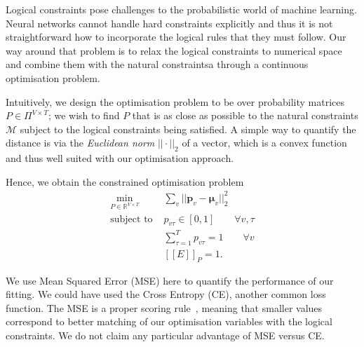 \documentclass[acmsmall, review, anonymous]{acmart}\settopmatter{printfolios=true,printccs=false,printacmref=false}
\newcommand{\qqpi}[2]{[\![#2]\!]_{#1}}
\newcommand{\margincomment}[2]{\marginpar{\scriptsize\color{Maroon}#1 says: #2}}
\newcommand{\cas}[1]{\margincomment{Charles}{#1}}
\begin{document}
Logical constraints pose challenges to the probabilistic world of
machine learning.  Neural networks cannot handle hard constraints explicitly and 
thus it is not straightforward how to incorporate the logical rules that they must follow.
Our way around that problem is to relax the logical constraints to numerical
space and combine them with the natural constraintsa through a continuous
optimisation problem.

Intuitively, we design the optimisation problem to be over
probability matrices $P \in \Pi^{V \times T}$; we wish to find
$P$ that is as close as possible to the natural constraints $\mathcal{M}$
subject to the logical constraints being satisfied.
A simple way to quantify the distance is via the \emph{Euclidean norm} $|| \cdot ||_2$ of a vector,  which is a convex function and thus well suited with our optimisation approach.

%
%
Hence, we obtain the constrained optimisation problem
\begin{equation}
	\begin{aligned}\label{eq:opt_naive}
		\underset{P \in \mathbb{R}^{V \times T}}{\mathrm{min}} &
		\sum_v || \bm{p}_v - \bm{\mu}_v ||_2^2                                                                  \\
		\text{subject to }                                     & p_{v\tau} \in [0, 1] \qquad \forall v, \tau    \\
		                                                       & \sum_{\tau=1}^T p_{v\tau} = 1 \qquad \forall v \\
		                                                       & \qqpi{P}{E} = 1.
	\end{aligned}
\end{equation}

We use Mean Squared Error (MSE) here to quantify the performance of our fitting.
We could have used the Cross Entropy (CE), another common loss function.  The
MSE is a proper scoring rule~\cite{gneiting07}, meaning that smaller values
correspond to better matching of our optimisation variables with the logical
constraints.  We do not claim any particular advantage of MSE versus CE.
\end{document}
